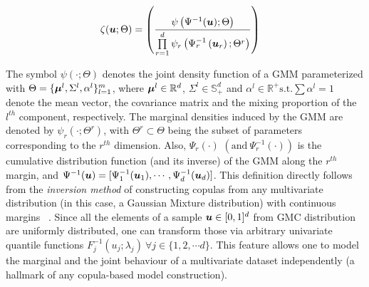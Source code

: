 \documentclass{article}
\begin{document}
\begin{align}\label{eq:GMC_density}
\zeta(\boldsymbol{u};\Theta) & = \left( \frac{\psi\left(\Psi^{-1}(\boldsymbol{u});\Theta\right)}{\prod\limits_{r=1}^{d}\psi_{r}\left(\Psi^{-1}_{r} \left( \boldsymbol{u}_r{} \right);\Theta^r \right)} \right)
\end{align}

The symbol $\psi(\cdot;\Theta)$ denotes the joint density function of a GMM parameterized with $\Theta = \{\boldsymbol{\mu}^l, \Sigma^l, \alpha^l\}_{l=1}^m$, where $\boldsymbol{\mu}^l \in \mathbb{R}^d$, $\Sigma^l \in \mathbb{S}_+^d$ and $\alpha^l \in \mathbb{R}^+ \text{s.t.} \sum \alpha^l=1$ denote the mean vector, the covariance matrix and the mixing proportion of the $l^{th}$ component, respectively. The marginal densities induced by the GMM are denoted by $\psi_r(\cdot;\Theta^r)$, with $\Theta^r\subset \Theta$ being the subset of parameters corresponding to the $r^{th}$ dimension. Also, $\Psi_r(\cdot)$ $\left(\text{and} \ \Psi^{-1}_r(\cdot) \right)$ is the cumulative distribution function (and its inverse) of the GMM along the $r^{th}$ margin, and $\Psi^{-1}(\boldsymbol{u})=[\Psi^{-1}_1(\boldsymbol{u}_1), \cdots, \Psi^{-1}_d(\boldsymbol{u}_d)]$. This definition directly follows from the \emph{inversion method} of constructing copulas from any multivariate distribution (in this case, a Gaussian Mixture distribution) with continuous margins ~\citep[see][chapter 3]{Nelsen1999Chapter3}. Since all the elements of a sample $\boldsymbol{u}\in [0,1]^d$ from GMC distribution are uniformly distributed, one can transform those via arbitrary univariate quantile functions $F_j^{-1}(u_j;\lambda_j) \ \forall j\in \{1,2,\cdots d\}$. This feature allows one to model the marginal and the joint behaviour of a multivariate dataset independently (a hallmark of any copula-based model construction).
\end{document}
